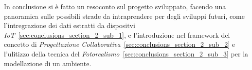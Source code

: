 In conclusione si è fatto un resoconto sul progetto sviluppato, facendo una panoramica sulle possibili strade
da intraprendere per degli sviluppi futuri, come l'intregrazione dei dati estratti da dispositvi
\emph{IoT}~\ref{sec:conclusions_section_2_sub_1},
e l'introduzione nel framework del concetto di \emph{Progettazione Collaborativa}~\ref{sec:conclusions_section_2_sub_2}
e l'ulitizzo della tecnica del \emph{Fotorealismo}~\ref{sec:conclusions_section_2_sub_3} per la modellazione di un ambiente.
